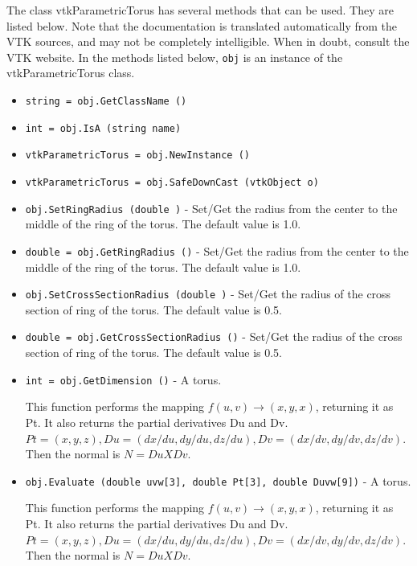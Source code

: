 The class vtkParametricTorus has several methods that can be used.
  They are listed below.
Note that the documentation is translated automatically from the VTK sources,
and may not be completely intelligible.  When in doubt, consult the VTK website.
In the methods listed below, \verb|obj| is an instance of the vtkParametricTorus class.
\begin{itemize}
\item  \verb|string = obj.GetClassName ()|

\item  \verb|int = obj.IsA (string name)|

\item  \verb|vtkParametricTorus = obj.NewInstance ()|

\item  \verb|vtkParametricTorus = obj.SafeDownCast (vtkObject o)|

\item  \verb|obj.SetRingRadius (double )| -  Set/Get the radius from the center to the middle of the ring of the
 torus.  The default value is 1.0.

\item  \verb|double = obj.GetRingRadius ()| -  Set/Get the radius from the center to the middle of the ring of the
 torus.  The default value is 1.0.

\item  \verb|obj.SetCrossSectionRadius (double )| -  Set/Get the radius of the cross section of ring of the torus.  The default value
 is 0.5.

\item  \verb|double = obj.GetCrossSectionRadius ()| -  Set/Get the radius of the cross section of ring of the torus.  The default value
 is 0.5.

\item  \verb|int = obj.GetDimension ()| -  A torus.

 This function performs the mapping $f(u,v) \rightarrow (x,y,x)$, returning it
 as Pt. It also returns the partial derivatives Du and Dv.
 $Pt = (x, y, z), Du = (dx/du, dy/du, dz/du), Dv = (dx/dv, dy/dv, dz/dv)$.
 Then the normal is $N = Du X Dv$.

\item  \verb|obj.Evaluate (double uvw[3], double Pt[3], double Duvw[9])| -  A torus.

 This function performs the mapping $f(u,v) \rightarrow (x,y,x)$, returning it
 as Pt. It also returns the partial derivatives Du and Dv.
 $Pt = (x, y, z), Du = (dx/du, dy/du, dz/du), Dv = (dx/dv, dy/dv, dz/dv)$.
 Then the normal is $N = Du X Dv$.


\end{itemize}
